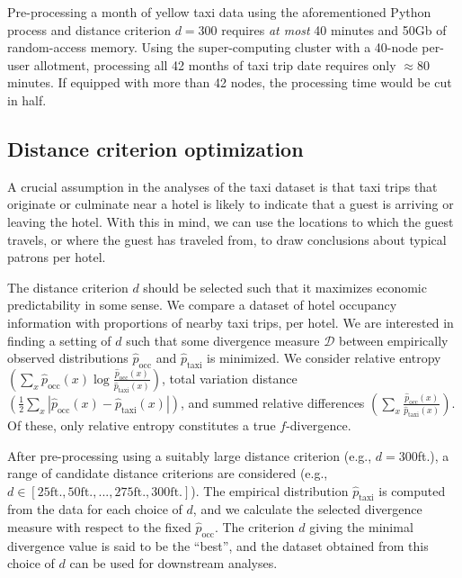 \documentclass[useAMS, referee, usenatbib]{biom}
\begin{document}
Pre-processing a month of yellow taxi data using the aforementioned Python process and distance criterion $d = 300$ requires \textit{at most} 40 minutes and 50Gb of random-access memory. Using the super-computing cluster with a 40-node per-user allotment, processing all 42 months of taxi trip date requires only $\approx$80 minutes. If equipped with more than 42 nodes, the processing time would be cut in half.

\subsection{Distance criterion optimization}

A crucial assumption in the analyses of the taxi dataset is that taxi trips that originate or culminate near a hotel is likely to indicate that a guest is arriving or leaving the hotel. With this in mind, we can use the locations to which the guest travels, or where the guest has traveled from, to draw conclusions about typical patrons per hotel.

The distance criterion $d$ should be selected such that it maximizes economic predictability in some sense. We compare a dataset of hotel occupancy information with proportions of nearby taxi trips, per hotel. We are interested in finding a setting of $d$ such that some divergence measure $\mathcal{D}$ between empirically observed distributions $\hat{p}_{\mathrm{occ}}$ and $\hat{p}_{\mathrm{taxi}}$ is minimized. We consider relative entropy $\left( \sum_x \hat{p}_{\mathrm{occ}} (x) \log \frac{\hat{p}_{\mathrm{occ}} (x)}{\hat{p}_{\mathrm{taxi}} (x)} \right)$, total variation distance $\left( \frac{1}{2} \sum_x | \hat{p}_{\mathrm{occ}} (x) - \hat{p}_{\mathrm{taxi}} (x) | \right)$, and summed relative differences $\left( \sum_x \frac{\hat{p}_{\mathrm{occ}} (x)}{\hat{p}_{\mathrm{taxi}} (x)} \right)$. Of these, only relative entropy constitutes a true $f$-divergence.

After pre-processing using a suitably large distance criterion (e.g., $d = 300$ft.), a range of candidate distance criterions are considered (e.g., $d \in [25 \mathrm{ft.}, 50 \mathrm{ft.}, ..., 275 \mathrm{ft.}, 300 \mathrm{ft.}]$). The empirical distribution $\hat{p}_{\mathrm{taxi}}$ is computed from the data for each choice of $d$, and we calculate the selected divergence measure with respect to the fixed $\hat{p}_{\mathrm{occ}}$. The criterion $d$ giving the minimal divergence value is said to be the ``best'', and the dataset obtained from this choice of $d$ can be used for downstream analyses.
\end{document}
